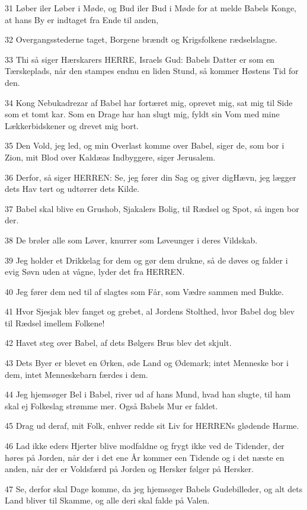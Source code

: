 \par 31 Løber iler Løber i Møde, og Bud iler Bud i Møde for at melde Babels Konge, at hans By er indtaget fra Ende til anden,
\par 32 Overgangsstederne taget, Borgene brændt og Krigsfolkene rædselslagne.
\par 33 Thi så siger Hærskarers HERRE, Israels Gud: Babels Datter er som en Tærskeplads, når den stampes endnu en liden Stund, så kommer Høstens Tid for den.
\par 34 Kong Nebukadrezar af Babel har fortæret mig, oprevet mig, sat mig til Side som et tomt kar. Som en Drage har han slugt mig, fyldt sin Vom med mine Lækkerbidskener og drevet mig bort.
\par 35 Den Vold, jeg led, og min Overlast komme over Babel, siger de, som bor i Zion, mit Blod over Kaldæas Indbyggere, siger Jerusalem.
\par 36 Derfor, så siger HERREN: Se, jeg fører din Sag og giver digHævn, jeg lægger dets Hav tørt og udtørrer dets Kilde.
\par 37 Babel skal blive en Grushob, Sjakalers Bolig, til Rædsel og Spot, så ingen bor der.
\par 38 De brøler alle som Løver, knurrer som Løveunger i deres Vildskab.
\par 39 Jeg holder et Drikkelag for dem og gør dem drukne, så de døves og falder i evig Søvn uden at vågne, lyder det fra HERREN.
\par 40 Jeg fører dem ned til af slagtes som Får, som Vædre sammen med Bukke.
\par 41 Hvor Sjesjak blev fanget og grebet, al Jordens Stolthed, hvor Babel dog blev til Rædsel imellem Folkene!
\par 42 Havet steg over Babel, af dets Bølgers Brus blev det skjult.
\par 43 Dets Byer er blevet en Ørken, øde Land og Ødemark; intet Menneske bor i dem, intet Menneskebarn færdes i dem.
\par 44 Jeg hjemsøger Bel i Babel, river ud af hans Mund, hvad han slugte, til ham skal ej Folkeslag strømme mer. Også Babels Mur er faldet.
\par 45 Drag ud deraf, mit Folk, enhver redde sit Liv for HERRENs glødende Harme.
\par 46 Lad ikke eders Hjerter blive modfaldne og frygt ikke ved de Tidender, der høres på Jorden, når der i det ene År kommer een Tidende og i det næste en anden, når der er Voldsfærd på Jorden og Hersker følger på Hersker.
\par 47 Se, derfor skal Dage komme, da jeg hjemsøger Babels Gudebilleder, og alt dets Land bliver til Skamme, og alle deri skal falde på Valen.
